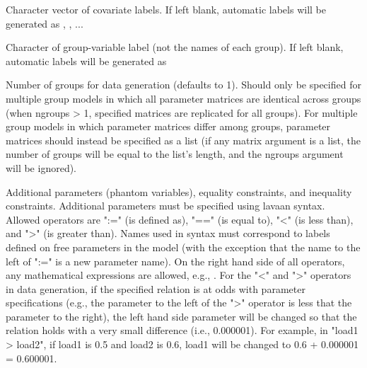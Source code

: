 \documentclass[a4paper]{book}
\begin{document}
\begin{Arguments}
\begin{ldescription}
\item[\code{covLab}]  
Character vector of covariate labels. If left blank, automatic labels will be generated as , , ... 

\item[\code{groupLab}] 
Character of group-variable label (not the names of each group). If left blank, automatic labels will be generated as 

\item[\code{ngroups}] 
Number of groups for data generation (defaults to 1). Should only be specified for multiple group models in which all parameter matrices are identical across groups (when ngroups > 1, specified matrices are replicated for all groups). For multiple group models in which parameter matrices differ among groups, parameter matrices should instead be specified as a list (if any matrix argument is a list, the number of groups will be equal to the list's length, and the ngroups argument will be ignored).

\item[\code{con}] 
Additional parameters (phantom variables), equality constraints, and inequality constraints. Additional parameters must be specified using lavaan syntax. Allowed operators are ":=" (is defined as), "==" (is equal to), "<" (is less than), and ">" (is greater than). Names used in syntax must correspond to labels defined on free parameters in the model (with the exception that the name to the left of ":=" is a new parameter name). On the right hand side of all operators, any mathematical expressions are allowed, e.g., . For the "<" and ">" operators in data generation, if the specified relation is at odds with parameter specifications (e.g., the parameter to the left of the ">" operator is less that the parameter to the right), the left hand side parameter will be changed so that the relation holds with a very small difference (i.e., 0.000001). For example, in "load1 > load2", if load1 is 0.5 and load2 is 0.6, load1 will be changed to 0.6 + 0.000001 = 0.600001. 

\end{ldescription}
\end{Arguments}
%
\end{document}
